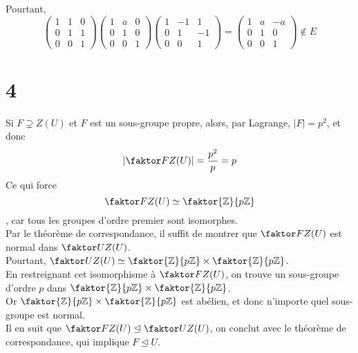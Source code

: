 \documentclass[11pt, a4paper]{article}
\newcommand{\zpz}{\faktor{\mathbb{Z}}{p \mathbb{Z}}}
\begin{document}
Pourtant,
\[ 
\begin{pmatrix}
	1 & 1 & 0\\
	0 & 1 & 1\\
	0 & 0 &1
\end{pmatrix}
\begin{pmatrix}
	1 & a & 0\\
	0 & 1 & 0\\
	0 & 0 &1
\end{pmatrix}
\begin{pmatrix}
	1 & -1 & 1\\
	0 & 1 & -1\\
	0 & 0 &1
\end{pmatrix}
=
\begin{pmatrix}
	1 & a & -a\\
	0 & 1 & 0\\
	0 & 0 &1
\end{pmatrix}
\notin E
\]
\section*{4}
Si $F\supsetneq Z( U) $ et $F$ est un sous-groupe propre, alors, par Lagrange, $|F| = p^{2}$, et donc
\[ 
	| \faktor F { Z(U) } | = \frac{p^{2}}{p}= p
\]
Ce qui force
\[ 
	\faktor F { Z(U) } \simeq \zpz
\]
, car tous les groupes d'ordre premier sont isomorphes.\\
Par le théorème de correspondance, il suffit de montrer que $\faktor F { Z(U) }$ est normal dans $\faktor U { Z( U) } $.\\
Pourtant, $\faktor U { Z( U) } \simeq \zpz \times \zpz$.\\
En restreignant cet isomorphisme à $\faktor F { Z( U) } $, on trouve un sous-groupe d'ordre $p$ dans $\zpz\times \zpz$.\\
Or $\zpz\times \zpz$ est abélien, et donc n'importe quel sous-groupe est normal.\\
Il en suit que $\faktor F { Z( U) } \trianglelefteq \faktor U { Z( U) } $, on conclut avec le théorème de correspondance, qui implique $F \trianglelefteq U$.\\
\end{document}
